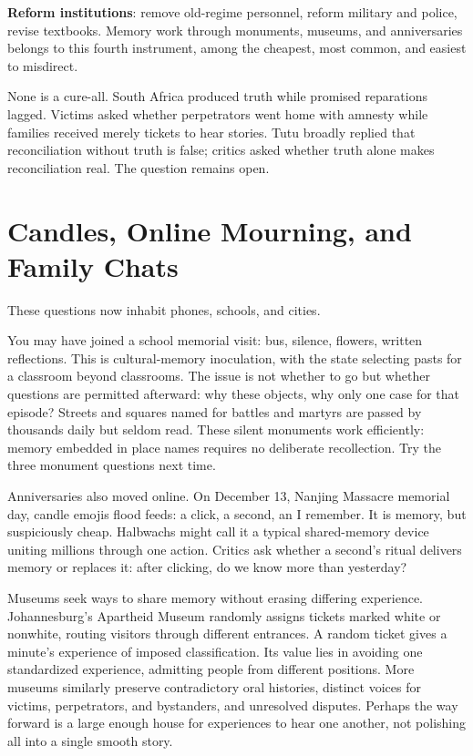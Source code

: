 \textbf{Reform institutions}: remove old-regime personnel, reform military and police, revise textbooks. Memory work through monuments, museums, and anniversaries belongs to this fourth instrument, among the cheapest, most common, and easiest to misdirect.

None is a cure-all. South Africa produced truth while promised reparations lagged. Victims asked whether perpetrators went home with amnesty while families received merely tickets to hear stories. Tutu broadly replied that reconciliation without truth is false; critics asked whether truth alone makes reconciliation real. The question remains open.

\section{Candles, Online Mourning, and Family Chats}
These questions now inhabit phones, schools, and cities.

You may have joined a school memorial visit: bus, silence, flowers, written reflections. This is cultural-memory inoculation, with the state selecting pasts for a classroom beyond classrooms. The issue is not whether to go but whether questions are permitted afterward: why these objects, why only one case for that episode? Streets and squares named for battles and martyrs are passed by thousands daily but seldom read. These silent monuments work efficiently: memory embedded in place names requires no deliberate recollection. Try the three monument questions next time.

Anniversaries also moved online. On December 13, Nanjing Massacre memorial day, candle emojis flood feeds: a click, a second, an I remember. It is memory, but suspiciously cheap. Halbwachs might call it a typical shared-memory device uniting millions through one action. Critics ask whether a second's ritual delivers memory or replaces it: after clicking, do we know more than yesterday?

Museums seek ways to share memory without erasing differing experience. Johannesburg's Apartheid Museum randomly assigns tickets marked white or nonwhite, routing visitors through different entrances. A random ticket gives a minute's experience of imposed classification. Its value lies in avoiding one standardized experience, admitting people from different positions. More museums similarly preserve contradictory oral histories, distinct voices for victims, perpetrators, and bystanders, and unresolved disputes. Perhaps the way forward is a large enough house for experiences to hear one another, not polishing all into a single smooth story.

